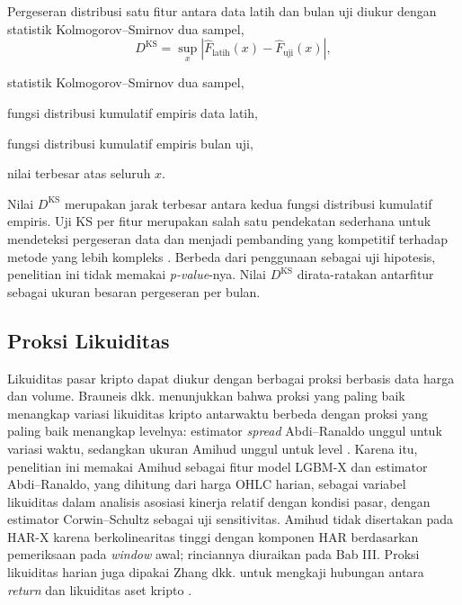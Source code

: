 Pergeseran distribusi satu fitur antara data latih dan bulan uji diukur dengan
statistik Kolmogorov--Smirnov dua sampel,
\begin{equation}
  D^{\text{KS}} = \sup_x
  \left| \hat{F}_{\text{latih}}(x) - \hat{F}_{\text{uji}}(x) \right|,
  \label{eq:ks}
\end{equation}
\begin{keterangan}
  \item[$D^{\text{KS}}$] statistik Kolmogorov--Smirnov dua sampel,
  \item[$\hat{F}_{\text{latih}}(x)$] fungsi distribusi kumulatif empiris
    data latih,
  \item[$\hat{F}_{\text{uji}}(x)$] fungsi distribusi kumulatif empiris
    bulan uji,
  \item[$\sup_x$] nilai terbesar atas seluruh $x$.
\end{keterangan}
Nilai $D^{\text{KS}}$ merupakan jarak terbesar antara kedua fungsi distribusi
kumulatif empiris. Uji KS per fitur merupakan salah satu pendekatan sederhana
untuk mendeteksi pergeseran data dan menjadi pembanding yang kompetitif
terhadap metode yang lebih kompleks \cite{rabanser2019}. Berbeda dari
penggunaan sebagai uji hipotesis, penelitian ini tidak memakai
\textit{p-value}-nya. Nilai $D^{\text{KS}}$ dirata-ratakan antarfitur sebagai
ukuran besaran pergeseran per bulan.

\subsection{Proksi Likuiditas}
\label{subsec:likuiditas}
Likuiditas pasar kripto dapat diukur dengan berbagai proksi berbasis data harga
dan volume. Brauneis dkk. menunjukkan bahwa proksi yang paling baik menangkap
variasi likuiditas kripto antarwaktu berbeda dengan proksi yang paling baik
menangkap levelnya: estimator \textit{spread} Abdi--Ranaldo \cite{abdi2017} unggul untuk
variasi waktu, sedangkan ukuran Amihud unggul untuk level \cite{brauneis2021}.
Karena itu, penelitian ini memakai Amihud sebagai fitur model LGBM-X dan
estimator
Abdi--Ranaldo, yang dihitung dari harga OHLC harian, sebagai variabel likuiditas
dalam analisis asosiasi kinerja relatif dengan kondisi pasar, dengan estimator
Corwin--Schultz \cite{corwin2012} sebagai uji sensitivitas. Amihud tidak disertakan pada HAR-X
karena berkolinearitas tinggi dengan komponen HAR berdasarkan pemeriksaan pada
\textit{window} awal; rinciannya diuraikan pada Bab III. Proksi likuiditas harian juga
dipakai Zhang dkk. untuk mengkaji hubungan antara \textit{return} dan
likuiditas aset kripto \cite{zhang2024}.


